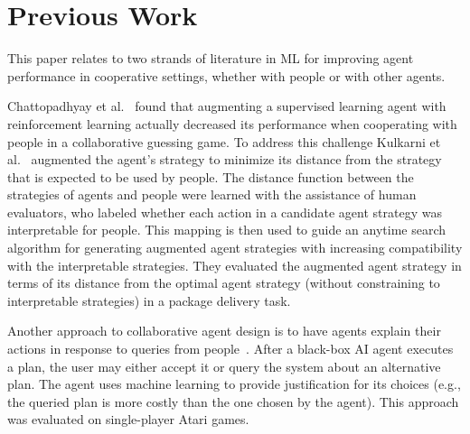 \documentclass[letterpaper]{article} %
\begin{document}
 \section{Previous Work}


This paper relates to two strands of literature in ML for improving agent performance in cooperative settings, whether with people or with other agents.

Chattopadhyay et al.~ found that augmenting a supervised learning agent with
reinforcement learning actually decreased its performance when cooperating with people in a  collaborative guessing game. To address this challenge Kulkarni et al.~ augmented the agent's strategy to minimize its distance from the  strategy that is expected to be used by people.
The distance function between the strategies of agents and people  were learned with the assistance of human evaluators, who labeled whether  each action in
a candidate agent strategy was interpretable for people.  This mapping is then used to guide an anytime search algorithm for  generating augmented agent strategies with increasing
compatibility with the interpretable strategies.
They evaluated the augmented agent strategy in terms of its distance from the optimal agent strategy (without constraining to interpretable strategies) in a package delivery task.

Another approach to collaborative agent design is to have agents explain their actions in response to queries from people~\cite{sreedharan2020bridging}. After a black-box AI agent executes a plan, the user may either accept it or query the system about an alternative plan. The agent uses machine learning  to provide justification for its choices  (e.g., the queried plan is more costly  than the one chosen by the agent). This approach was evaluated on  single-player Atari games.
\end{document}
